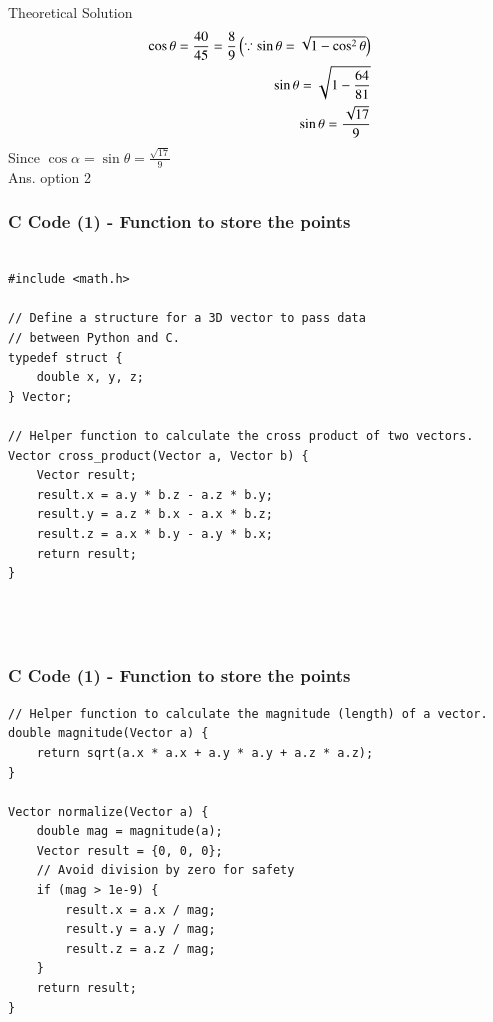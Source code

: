\documentclass{beamer}
\begin{document}
\begin{frame}{Theoretical Solution} 
\begin{align}
   \cos\theta=\frac{40}{45}=\frac{8}{9}\left(\because\sin\theta=\sqrt{1-\cos^2\theta}\right)\\
  \sin\theta=\sqrt{1-\frac{64}{81}}\\
  \sin\theta=\frac{\sqrt{17}}{9}
\end{align}
Since $\cos\alpha=\sin\theta=\frac{\sqrt{17}}{9}$\\
Ans. option 2
\end{frame}


\begin{frame}[fragile]
    \frametitle{C Code (1) - Function to store the points }

    \begin{lstlisting}

#include <math.h>

// Define a structure for a 3D vector to pass data
// between Python and C.
typedef struct {
    double x, y, z;
} Vector;

// Helper function to calculate the cross product of two vectors.
Vector cross_product(Vector a, Vector b) {
    Vector result;
    result.x = a.y * b.z - a.z * b.y;
    result.y = a.z * b.x - a.x * b.z;
    result.z = a.x * b.y - a.y * b.x;
    return result;
}




    \end{lstlisting}
\end{frame}

\begin{frame}[fragile]
    \frametitle{C Code (1) - Function to store the points }

    \begin{lstlisting}
// Helper function to calculate the magnitude (length) of a vector.
double magnitude(Vector a) {
    return sqrt(a.x * a.x + a.y * a.y + a.z * a.z);
}

Vector normalize(Vector a) {
    double mag = magnitude(a);
    Vector result = {0, 0, 0};
    // Avoid division by zero for safety
    if (mag > 1e-9) { 
        result.x = a.x / mag;
        result.y = a.y / mag;
        result.z = a.z / mag;
    }
    return result;
}



    \end{lstlisting}
\end{frame}
\end{document}
